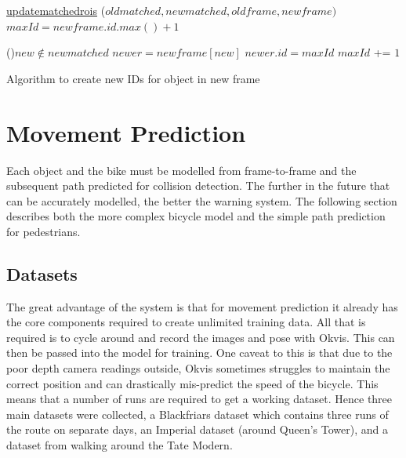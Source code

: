 \documentclass[11pt,twoside]{report}
\begin{document}
\begin{algorithm}[H]
	\DontPrintSemicolon
	\SetAlgoLined
	\underline{update\textunderscore matched\textunderscore rois} ($old$\textunderscore$matched,new$\textunderscore$matched,old$\textunderscore$frame,new$\textunderscore$frame)$\;
	\texttt{\\}
	$maxId = new$\textunderscore$frame.id.max()+1$ 
	
	\ForEach(){$new \notin new$\textunderscore$matched$}{
		$newer = new$\textunderscore$frame[new]$ 
		$newer.id = maxId$ 
		$maxId$ += $1$ 
	}
	\texttt{\\}
	\caption{Algorithm to create new IDs for object in new frame}
	\label{alg:weights}
\end{algorithm}




\section{Movement Prediction}

Each object and the bike must be modelled from frame-to-frame and the subsequent path predicted for collision detection. The further in the future that can be accurately modelled, the better the warning system. The following section describes both the more complex bicycle model and the simple path prediction for pedestrians.


\subsection{Datasets}
The great advantage of the system is that for movement prediction it already has the core components required to create unlimited training data. All that is required is to cycle around and record the images and pose with Okvis. This can then be passed into the model for training. One caveat to this is that due to the poor depth camera readings outside, Okvis sometimes struggles to maintain the correct position and can drastically mis-predict the speed of the bicycle. This means that a number of runs are required to get a working dataset. Hence three main datasets were collected, a Blackfriars dataset which contains three runs of the route on separate days, an Imperial dataset (around Queen's Tower), and a dataset from walking around the Tate Modern.
\end{document}
